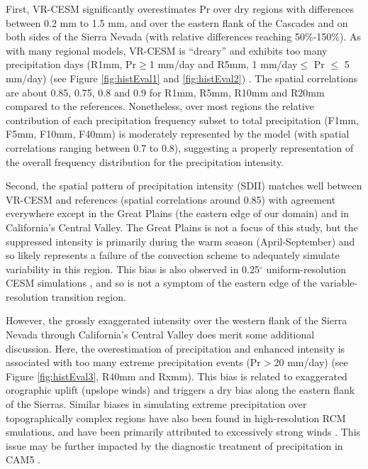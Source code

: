 \documentclass{ametsoc}
\begin{document}
First, VR-CESM significantly overestimates Pr over dry regions with differences between 0.2 mm to 1.5 mm, and over the eastern flank of the Cascades and on both sides of the Sierra Nevada (with relative differences reaching 50$\%$-150$\%$).  As with many regional models, VR-CESM is ``dreary'' and exhibits too many precipitation days (R1mm, Pr$\geq$1 mm/day and R5mm, 1 mm/day$\leq$ Pr $\leq$ 5 mm/day) (see Figure \ref{fig:histEval1} and \ref{fig:histEval2}) \citep{stephens2010dreary}. The spatial correlations are about 0.85, 0.75, 0.8 and 0.9 for R1mm, R5mm, R10mm and R20mm compared to the references. Nonetheless, over most regions the relative contribution of each precipitation frequency subset to total precipitation (F1mm, F5mm, F10mm, F40mm) is moderately represented by the model (with spatial correlations ranging between 0.7 to 0.8), suggesting a properly representation of the overall frequency distribution for the precipitation intensity.

Second, the spatial pattern of precipitation intensity (SDII) matches well between VR-CESM and references (spatial correlations around 0.85) with agreement everywhere except in the Great Plains (the eastern edge of our domain) and in California's Central Valley.  The Great Plains is not a focus of this study, but the suppressed intensity is primarily during the warm season (April-September) and so likely represents a failure of the convection scheme to adequately simulate variability in this region.  This bias is also observed in 0.25$^\circ$ uniform-resolution CESM simulations \citep{small2014new}, and so is not a symptom of the eastern edge of the variable-resolution transition region.

However, the grossly exaggerated intensity over the western flank of the Sierra Nevada through California's Central Valley does merit some additional discussion. Here, the overestimation of precipitation and enhanced intensity is associated with too many extreme precipitation events (Pr$>$20 mm/day) (see Figure \ref{fig:histEval3}, R40mm and Rxmm).  This bias is related to exaggerated orographic uplift (upslope winds) and triggers a dry bias along the eastern flank of the Sierras.  Similar biases in simulating extreme precipitation over topographically complex regions have also been found in high-resolution RCM smulations, and have been primarily attributed to excessively strong winds \citep{walker2009evaluation, singh2013precipitation}.  This issue may be further impacted by the diagnostic treatment of precipitation in CAM5 \citep{morrison2008new, gettelman2008new}.
\end{document}
